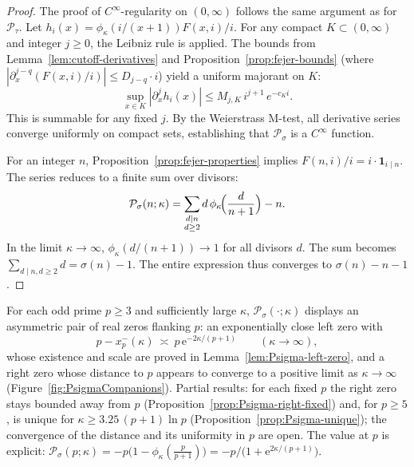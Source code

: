 \begin{proof}
The proof of $C^\infty$-regularity on $(0,\infty)$ follows the same argument as for $\mathcal{P}_{\tau}$. Let $h_i(x) = \phi_{\kappa}(i/(x+1)) F(x,i)/i$. For any compact $K\subset(0,\infty)$ and integer $j\ge0$, the Leibniz rule is applied. The bounds from Lemma~\ref{lem:cutoff-derivatives} and Proposition~\ref{prop:fejer-bounds} (where $|\partial_x^{j-q} (F(x,i)/i)| \le D_{j-q} \cdot i$) yield a uniform majorant on $K$:
\[
\sup_{x\in K} |\partial_x^j h_i(x)| \le M_{j,K} \, i^{j+1} \, e^{-c_K i}.
\]
This is summable for any fixed $j$. By the Weierstrass M-test, all derivative series converge uniformly on compact sets, establishing that $\mathcal{P}_{\sigma}$ is a $C^\infty$ function.

For an integer $n$, Proposition~\ref{prop:fejer-properties} implies $F(n,i)/i = i \cdot \mathbf{1}_{i\mid n}$. The series reduces to a finite sum over divisors:
\[
\mathcal{P}_{\sigma}(n;\kappa)=\sum_{\substack{d\mid n\\ d\ge2}} d\,\phi_{\kappa}\!\Bigl(\frac{d}{n+1}\Bigr)-n.
\]
In the limit $\kappa\to\infty$, $\phi_{\kappa}(d/(n+1))\to 1$ for all divisors $d$. The sum becomes $\sum_{d\mid n, d\ge2} d = \sigma(n)-1$. The entire expression thus converges to $\sigma(n)-n-1$.
\end{proof}

\begin{conjecture}\label{conj:Psigma-companions}
For each odd prime $p\ge 3$ and sufficiently large $\kappa$, $\mathcal P_\sigma(\cdot;\kappa)$ displays an asymmetric pair of real zeros flanking $p$: an exponentially close left zero with
\[
p - x_p^-(\kappa)\ \asymp\ p\,\mathrm e^{-2\kappa/(p+1)}\qquad(\kappa\to\infty),
\]
whose existence and scale are proved in Lemma~\ref{lem:Psigma-left-zero}, and a right zero whose distance to $p$ appears to converge to a positive limit as $\kappa\to\infty$ (Figure~\ref{fig:PsigmaCompanions}). Partial results: for each fixed $p$ the right zero stays bounded away from $p$ (Proposition~\ref{prop:Psigma-right-fixed}) and, for $p\ge5$, is unique for $\kappa\ge3.25\,(p+1)\ln p$ (Proposition~\ref{prop:Psigma-unique}); the convergence of the distance and its uniformity in $p$ are open. The value at $p$ is explicit: $\mathcal P_\sigma(p;\kappa)=-p\bigl(1-\phi_\kappa(\tfrac{p}{p+1})\bigr)=-p/\bigl(1+\mathrm e^{2\kappa/(p+1)}\bigr)$.
\end{conjecture}


